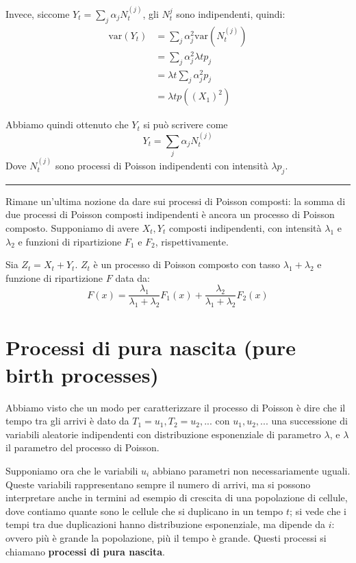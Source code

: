 \documentclass[a4paper,12pt]{book}
\begin{document}
Invece, siccome $ Y_t = \sum_{j} \alpha_{j} N_t^{(j)} $, gli $ N_t^{j} $ sono indipendenti, quindi:
\begin{align*}
	\text{var}(Y_t) & = \sum_{j} \alpha_j^2 \text{var}(N_t^{(j)}) \\
	& = \sum_{j} \alpha_j^2\lambda t p_j \\
	& = \lambda t \sum_{j} \alpha_j^2 p_j \\
	& = \lambda t p((X_1)^2)
\end{align*}

Abbiamo quindi ottenuto che $ Y_t $ si può scrivere come 
$$ Y_t = \sum_j \alpha_j N_t^{(j)} $$
Dove $ N_t^{(j)} $ sono processi di Poisson indipendenti con intensità $\lambda p_j$.
\vspace{1cm}
\hrule
\vspace{1cm}
Rimane un'ultima nozione da dare sui processi di Poisson composti: la somma di due processi di Poisson composti indipendenti è ancora un processo di Poisson composto. Supponiamo di avere $ X_t, Y_t $ composti indipendenti, con intensità $\lambda_1$ e $\lambda_2$ e funzioni di ripartizione $ F_1 $ e $ F_2 $, rispettivamente. 

Sia $Z_t = X_t + Y_t$. $ Z_t $ è un processo di Poisson composto con tasso $\lambda_1 + \lambda_{2}$ e funzione di ripartizione $ F $ data da:
$$ F(x)  = \frac{\lambda_1}{\lambda_1 + \lambda_{2}} F_1(x) + \frac{\lambda_{2}}{\lambda_{1} + \lambda_{2}}F_2(x)
$$

\section{Processi di pura nascita (pure birth processes)}
Abbiamo visto che un modo per caratterizzare il processo di Poisson è dire che il tempo tra gli arrivi è dato da $ T_1 = u_1, T_2 = u_2, ... $ con $ u_1, u_2, ... $ una successione di variabili aleatorie indipendenti con distribuzione esponenziale di parametro $\lambda$, e $\lambda$ il parametro del processo di Poisson.

Supponiamo ora che le variabili $ u_i $ abbiano parametri non necessariamente uguali. Queste variabili rappresentano sempre il numero di arrivi, ma si possono interpretare anche in termini ad esempio di crescita di una popolazione di cellule, dove contiamo quante sono le cellule che si duplicano in un tempo $ t $; %
 si vede che i tempi tra due duplicazioni hanno distribuzione esponenziale, ma dipende da $ i $: ovvero più è grande la popolazione, più il tempo è grande. Questi processi si chiamano \textbf{processi di pura nascita}. 
 
\end{document}

